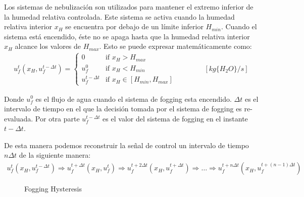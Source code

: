 \documentclass{article}
\begin{document}
Los sistemas de nebulización son utilizados para mantener el extremo inferior de la humedad relativa controlada. 
%
Este sistema se activa cuando la humedad relativa interior $x_H$ se encuentra por debajo de un límite inferior $H_{min}$. 
%
Cuando el sistema está encendido, éste no se apaga hasta que la humedad relativa interior $x_H$ alcance los valores de $H_{max}$. Esto se puede expresar matemáticamente como:
\begin{gather}
    u^{t}_{f}(x_H,u^{t-\Delta t}_{f}) = \begin{cases}
        0 & \text{if } x_H > H_{max} \\[2pt]
        u_f^0 & \text{if } x_H < H_{min} \\[2pt]
        u^{t-\Delta t}_{f} & \text{if } x_H \in [H_{min},H_{max}]
    \end{cases}  \hspace{4em} [kg\{H_2O\}/s]
\end{gather}

Donde $u_f^0$ es el flujo de agua cuando el sistema de fogging esta encendido.  
%
$\Delta t$ es el intervalo de tiempo en el que la decisión tomada por el sistema de fogging es re-evaluada.
%
Por otra parte $u^{t-\Delta t}_f$ es el valor del sistema de fogging en el instante $t-\Delta t$. 
%
\newline 

De esta manera podemos reconstruir la señal de control un intervalo de tiempo $n\Delta t$  de la siguiente manera:
\begin{gather}
    u^{t}_{f}(x_H,u^{t-\Delta t}_{f}) \Rightarrow
    u^{t+\Delta t}_{f}(x_H,u^{t}_{f}) \Rightarrow  
    u^{t+2\Delta t}_{f}(x_H,u^{t+\Delta t}_{f}) \Rightarrow \dots \Rightarrow
    u^{t+n\Delta t}_{f}(x_H,u^{t+(n-1)\Delta t}_{f})
\end{gather}

\begin{figure}
    \centering
        \caption{Fogging Hysteresis}
\end{figure}
\end{document}
